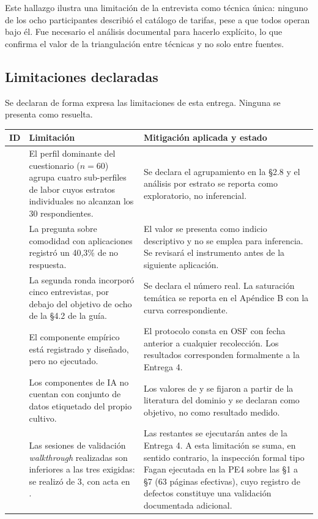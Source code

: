 Este hallazgo ilustra una limitación de la entrevista como técnica única: ninguno de los ocho
participantes describió el catálogo de tarifas, pese a que todos operan bajo él. Fue necesario el
análisis documental para hacerlo explícito, lo que confirma el valor de la triangulación entre
técnicas y no solo entre fuentes.

\subsection{Limitaciones declaradas}

Se declaran de forma expresa las limitaciones de esta entrega. Ninguna se presenta como resuelta.

\begin{longtable}{|C{1.2cm}|L{6.4cm}|L{7.4cm}|}
\hline
{}\textbf{ID} & \textbf{Limitación} & \textbf{Mitigación aplicada y estado} \\
\hline
\endhead
{} & El perfil dominante del cuestionario ($n=60$) agrupa cuatro sub-perfiles de labor cuyos estratos individuales no alcanzan los 30 respondientes. & Se declara el agrupamiento en la §2.8 y el análisis por estrato se reporta como exploratorio, no inferencial. \\ \hline
{} & La pregunta sobre comodidad con aplicaciones registró un 40{,}3\% de no respuesta. & El valor se presenta como indicio descriptivo y no se emplea para inferencia. Se revisará el instrumento antes de la siguiente aplicación. \\ \hline
{} & La segunda ronda incorporó cinco entrevistas, por debajo del objetivo de ocho de la §4.2 de la guía. & Se declara el número real. La saturación temática se reporta en el Apéndice B con la curva correspondiente. \\ \hline
{} & El componente empírico está registrado y diseñado, pero no ejecutado. & El protocolo consta en OSF con fecha anterior a cualquier recolección. Los resultados corresponden formalmente a la Entrega 4. \\ \hline
{} & Los componentes de IA no cuentan con conjunto de datos etiquetado del propio cultivo. & Los valores de  y  se fijaron a partir de la literatura del dominio \cite{suharjito2021,goh2025,rosbi2024} y se declaran como objetivo, no como resultado medido. \\ \hline
{} & Las sesiones de validación \emph{walkthrough} realizadas son inferiores a las tres exigidas: se realizó  de 3, con acta en . & Las restantes se ejecutarán antes de la Entrega 4. A esta limitación se suma, en sentido contrario, la inspección formal tipo Fagan ejecutada en la PE4 sobre las §1 a §7 (63 páginas efectivas), cuyo registro de defectos constituye una validación documentada adicional. \\ \hline

\end{longtable}
